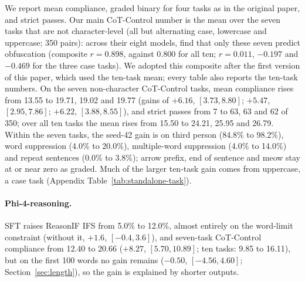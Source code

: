 We report mean compliance, graded binary for four tasks as in the original paper, and strict passes. Our main CoT-Control number is the mean over the seven tasks that are not character-level (all but alternating case, lowercase and uppercase; 350 pairs): across their eight models, \citet{haskins2026obfuscation} find that only these seven predict obfuscation (composite $r=0.898$, against $0.800$ for all ten; $r=0.011$, $-0.197$ and $-0.469$ for the three case tasks). We adopted this composite after the first version of this paper, which used the ten-task mean; every table also reports the ten-task numbers.
On the seven non-character CoT-Control tasks, mean compliance rises from 13.55 to 19.71, 19.02 and 19.77 (gains of $+6.16$, $[3.73, 8.80]$; $+5.47$, $[2.95, 7.86]$; $+6.22$, $[3.88, 8.55]$), and strict passes from 7 to 63, 63 and 62 of 350; over all ten tasks the mean rises from 15.50 to 24.21, 25.95 and 26.79.
Within the seven tasks, the seed-42 gain is on third person (84.8\% to 98.2\%), word suppression (4.0\% to 20.0\%), multiple-word suppression (4.0\% to 14.0\%) and repeat sentences (0.0\% to 3.8\%); arrow prefix, end of sentence and meow stay at or near zero as graded. Much of the larger ten-task gain comes from uppercase, a case task (Appendix Table~\ref{tab:standalone-task}).
\paragraph{Phi-4-reasoning.} SFT raises ReasonIF IFS from 5.0\% to 12.0\%, almost entirely on the word-limit constraint (without it, $+1.6$, $[-0.4, 3.6]$), and seven-task CoT-Control compliance from 12.40 to 20.66 ($+8.27$, $[5.70, 10.89]$; ten tasks: 9.85 to 16.11), but on the first 100 words no gain remains ($-0.50$, $[-4.56, 4.60]$; Section~\ref{sec:length}), so the gain is explained by shorter outputs.
